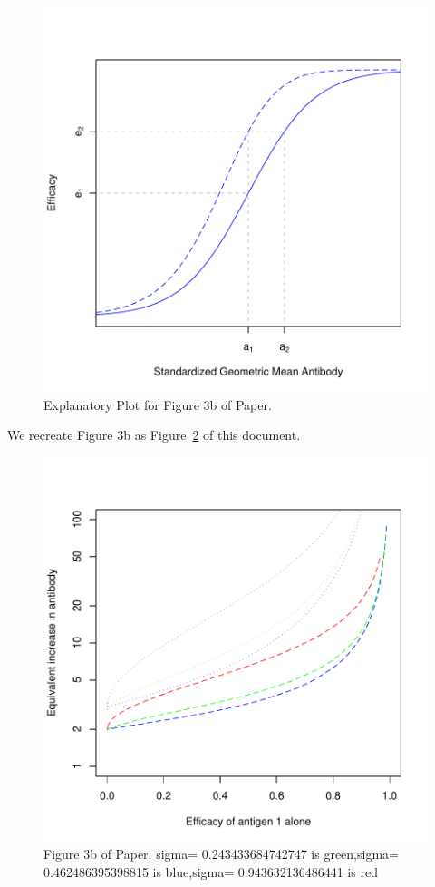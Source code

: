 \documentclass{article}[12pt]
\begin{document}
\begin{figure}
\caption{Explanatory Plot for Figure 3b of Paper.
 \label{fig:e3bplot} }

\includegraphics{hbimdetails-explanationfig3b}
\end{figure}

We recreate Figure 3b as Figure~\ref{fig:3b} of this document. 

\begin{figure}
\caption{Figure 3b of Paper.
sigma= 0.243433684742747  is  green,sigma= 0.462486395398815  is  blue,sigma= 0.943632136486441  is  red
 \label{fig:3b} }
\includegraphics{hbimdetails-fig3b}
\end{figure}
\end{document}
